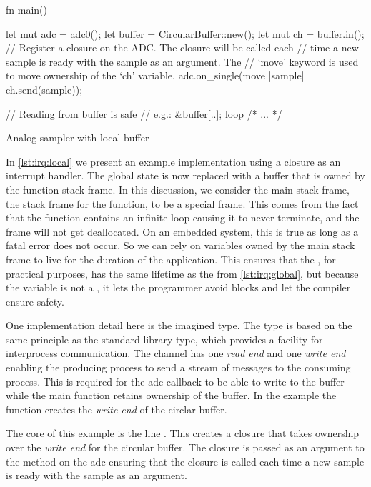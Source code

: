 \begin{listing}[H]
  \begin{rustcode}
fn main() {
  let mut adc = adc0();
  let buffer = CircularBuffer::new();
  let mut ch = buffer.in();
  // Register a closure on the ADC. The closure will be called each
  // time a new sample is ready with the sample as an argument. The
  // `move' keyword is used to move ownership of the `ch' variable.
  adc.on_single(move |sample| ch.send(sample));

  // Reading from buffer is safe
  // e.g.: &buffer[..];
  loop { /* ... */ }
}
  \end{rustcode}
  \caption{Analog sampler with local buffer}
  \label{lst:irq:local}
\end{listing}

In \autoref{lst:irq:local} we present an example implementation using a closure as an interrupt handler.
The global state is now replaced with a buffer that is owned by the  function stack frame.
In this discussion, we consider the main stack frame, the stack frame for the  function, to be a special frame.
This comes from the fact that the  function contains an infinite loop causing it to never terminate, and the frame will not get deallocated.
On an embedded system, this is true as long as a fatal error does not occur.
So we can rely on variables owned by the main stack frame to live for the duration of the application.
This ensures that the , for practical purposes, has the same lifetime as the  from \autoref{lst:irq:global}, but because the variable is not a , it lets the programmer avoid {\unsafe} blocks and let the compiler ensure safety.

One implementation detail here is the imagined  type.
The type is based on the same principle as the {\rust} standard library  type, which provides a facility for interprocess communication.
The channel has one \textit{read end} and one \textit{write end} enabling the producing process to send a stream of messages to the consuming process.
This is required for the \gls{adc} callback to be able to write to the buffer while the main function retains ownership of the buffer.
In the example the  function creates the \textit{write end} of the circlar buffer.

The core of this example is the line .
This creates a closure that takes ownership over the \textit{write end} for the circular buffer.
The closure is passed as an argument to the  method on the \gls{adc} ensuring that the closure is called each time a new sample is ready with the sample as an argument.

